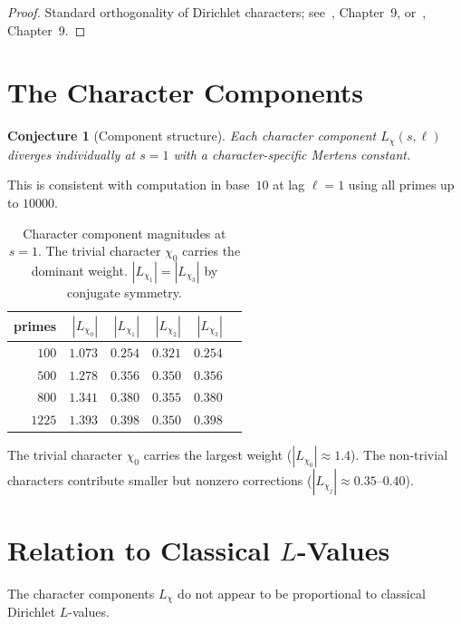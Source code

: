 \documentclass[12pt]{amsart}
\newtheorem{conjecture}[theorem]{Conjecture}
\theoremstyle{definition}
\theoremstyle{remark}
\begin{document}
\begin{proof}
Standard orthogonality of Dirichlet characters;
see~\cite{davenport}, Chapter~9, or~\cite{iwaniec}, Chapter~9.
\end{proof}

\section{The Character Components}

\begin{conjecture}[Component structure]\label{conj:components}
Each character component $L_{\chi}(s, \ell)$ diverges
individually at $s = 1$ with a character-specific Mertens
constant.
\end{conjecture}

This is consistent with computation in base~$10$ at lag
$\ell = 1$ using all primes up to $10000$.

\begin{table}[h]
\centering
\begin{tabular}{rrrrrr}
\toprule
primes & $|L_{\chi_0}|$ & $|L_{\chi_1}|$ &
$|L_{\chi_2}|$ & $|L_{\chi_3}|$ \\
\midrule
$100$ & $1.073$ & $0.254$ & $0.321$ & $0.254$ \\
$500$ & $1.278$ & $0.356$ & $0.350$ & $0.356$ \\
$800$ & $1.341$ & $0.380$ & $0.355$ & $0.380$ \\
$1225$ & $1.393$ & $0.398$ & $0.350$ & $0.398$ \\
\bottomrule
\end{tabular}
\caption{Character component magnitudes at $s = 1$.
The trivial character $\chi_0$ carries the dominant weight.
$|L_{\chi_1}| = |L_{\chi_3}|$ by conjugate symmetry.}
\label{tab:components}
\end{table}

The trivial character $\chi_0$ carries the largest weight
($|L_{\chi_0}| \approx 1.4$). The non-trivial characters
contribute smaller but nonzero corrections
($|L_{\chi_j}| \approx 0.35$--$0.40$).

\section{Relation to Classical $L$-Values}

The character components $L_{\chi}$ do not appear to be
proportional to classical Dirichlet $L$-values.
\end{document}
